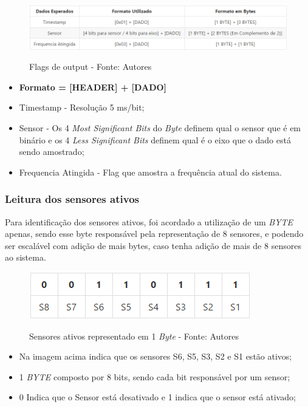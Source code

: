 \begin{figure}[H]
\centering
\includegraphics[keepaspectratio=true,scale=0.8]{figuras/flags_output.png}
\label{fig:flags_input}
\caption{Flags de output - Fonte: Autores}
\end{figure}

\begin{itemize}
  \item \textbf{Formato = [HEADER] + [DADO]}
  \item Timestamp - Resolução 5 ms/bit;
  \item Sensor - Os 4 \textit{Most Significant Bits} do \textit{Byte} definem qual o sensor que é em binário e os 4 \textit{Less Significant Bits} definem qual é o eixo que o dado está sendo amostrado;
  \item Frequencia Atingida - Flag que amostra a frequência atual do sistema.
\end{itemize}

\subsubsection*{Leitura dos sensores ativos}

Para identificação dos sensores ativos, foi acordado a utilização de um \textit{BYTE} apenas, sendo esse byte responsável pela representação de 8 sensores, e podendo ser escalável com adição de mais bytes, caso tenha adição de mais de 8 sensores ao sistema.

\begin{figure}[H]
\centering
\includegraphics[keepaspectratio=true,scale=0.9]{figuras/active_sensors.png}
\label{fig:active_sensors}
\caption{Sensores ativos representado em 1 \textit{Byte} - Fonte: Autores}
\end{figure}

\begin{itemize}
  \item Na imagem acima indica que os sensores S6, S5, S3, S2 e S1 estão ativos;
  \item 1 \textit{BYTE} composto por 8 bits, sendo cada bit responsável por um sensor;
  \item 0 Indica que o Sensor está desativado e 1 indica que o sensor está ativado;
\end{itemize}

